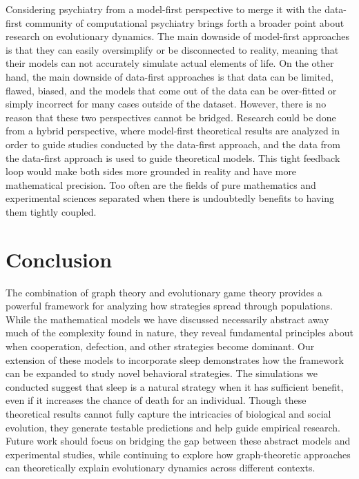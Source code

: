 \documentclass[11pt]{article}
\begin{document}
Considering psychiatry from a model-first perspective to merge it with the data-first community of computational psychiatry brings forth a broader point about research on evolutionary dynamics. The main downside of model-first approaches is that they can easily oversimplify or be disconnected to reality, meaning that their models can not accurately simulate actual elements of life. On the other hand, the main downside of data-first approaches is that data can be limited, flawed, biased, and the models that come out of the data can be over-fitted or simply incorrect for many cases outside of the dataset. However, there is no reason that these two perspectives cannot be bridged. Research could be done from a hybrid perspective, where model-first theoretical results are analyzed in order to guide studies conducted by the data-first approach, and the data from the data-first approach is used to guide theoretical models. This tight feedback loop would make both sides more grounded in reality and have more mathematical precision. Too often are the fields of pure mathematics and experimental sciences separated when there is undoubtedly benefits to having them tightly coupled. 


\section{Conclusion}
The combination of graph theory and evolutionary game theory provides a powerful framework for analyzing how strategies spread through populations. While the mathematical models we have discussed necessarily abstract away much of the complexity found in nature, they reveal fundamental principles about when cooperation, defection, and other strategies become dominant. Our extension of these models to incorporate sleep demonstrates how the framework can be expanded to study novel behavioral strategies. The simulations we conducted suggest that sleep is a natural strategy when it has sufficient benefit, even if it increases the chance of death for an individual. Though these theoretical results cannot fully capture the intricacies of biological and social evolution, they generate testable predictions and help guide empirical research. Future work should focus on bridging the gap between these abstract models and experimental studies, while continuing to explore how graph-theoretic approaches can theoretically explain evolutionary dynamics across different contexts.
\end{document}
